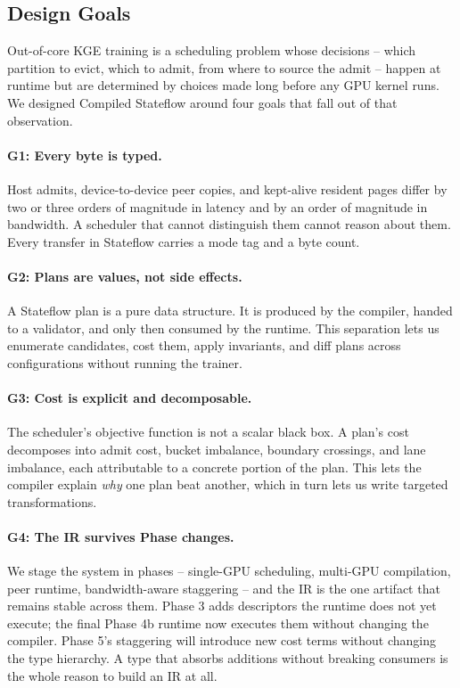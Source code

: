 %

\subsection{Design Goals}\label{sec:ir:goals}

Out-of-core KGE training is a scheduling problem whose decisions --
which partition to evict, which to admit, from where to source the
admit -- happen at runtime but are determined by choices made long
before any GPU kernel runs. We designed Compiled Stateflow around four
goals that fall out of that observation.

\paragraph{G1: Every byte is typed.} Host admits, device-to-device peer
copies, and kept-alive resident pages differ by two or three orders of
magnitude in latency and by an order of magnitude in bandwidth. A
scheduler that cannot distinguish them cannot reason about them. Every
transfer in Stateflow carries a mode tag and a byte count.

\paragraph{G2: Plans are values, not side effects.} A Stateflow plan is
a pure data structure. It is produced by the compiler, handed to a
validator, and only then consumed by the runtime. This separation lets
us enumerate candidates, cost them, apply invariants, and diff plans
across configurations without running the trainer.

\paragraph{G3: Cost is explicit and decomposable.} The scheduler's
objective function is not a scalar black box. A plan's cost decomposes
into admit cost, bucket imbalance, boundary crossings, and lane
imbalance, each attributable to a concrete portion of the plan. This
lets the compiler explain \emph{why} one plan beat another, which in
turn lets us write targeted transformations.

\paragraph{G4: The IR survives Phase changes.} We stage the system in
phases -- single-GPU scheduling, multi-GPU compilation, peer runtime,
bandwidth-aware staggering -- and the IR is the one artifact that
remains stable across them. Phase 3 adds descriptors the runtime does
not yet execute; the final Phase 4b runtime now executes them without
changing the compiler. Phase 5's staggering will introduce new cost
terms without changing the type hierarchy. A type that absorbs
additions without breaking consumers is the whole reason to build an
IR at all.

